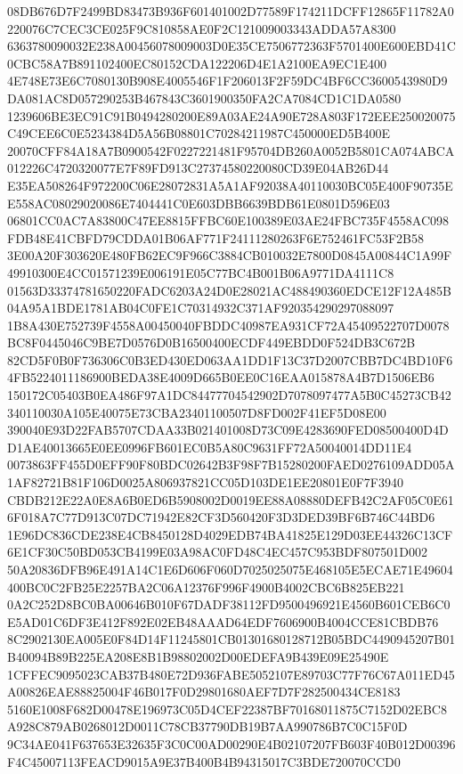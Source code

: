 \documentclass[UTF8,fontset=fandol,zihao=-4,a4paper]{ctexart}
\begin{document}
{{08DB676D7F2499BD83473B936F601401002D77589F174211DCFF12865F11782A0220076C7CEC3CE025F9C810858AE0F2C121009003343ADDA57A8300
6363780090032E238A00456078009003D0E35CE7506772363F5701400E600EBD41C0CBC58A7B891102400EC80152CDA122206D4E1A2100EA9EC1E400
4E748E73E6C7080130B908E4005546F1F206013F2F59DC4BF6CC3600543980D9DA081AC8D057290253B467843C3601900350FA2CA7084CD1C1DA0580
1239606BE3EC91C91B0494280200E89A03AE24A90E728A803F172EEE250020075C49CEE6C0E5234384D5A56B08801C70284211987C450000ED5B400E
20070CFF84A18A7B0900542F0227221481F95704DB260A0052B5801CA074ABCA012226C4720320077E7F89FD913C27374580220080CD39E04AB26D44
E35EA508264F972200C06E28072831A5A1AF92038A40110030BC05E400F90735EE558AC08029020086E7404441C0E603DBB6639BDB61E0801D596E03
06801CC0AC7A83800C47EE8815FFBC60E100389E03AE24FBC735F4558AC098FDB48E41CBFD79CDDA01B06AF771F24111280263F6E752461FC53F2B58
3E00A20F303620E480FB62EC9F966C3884CB010032E7800D0845A00844C1A99F49910300E4CC01571239E006191E05C77BC4B001B06A9771DA4111C8
01563D33374781650220FADC6203A24D0E28021AC488490360EDCE12F12A485B04A95A1BDE1781AB04C0FE1C70314932C371AF920354290297088097
1B8A430E752739F4558A00450040FBDDC40987EA931CF72A45409522707D0078BC8F0445046C9BE7D0576D0B16500400ECDF449EBDD0F524DB3C672B
82CD5F0B0F736306C0B3ED430ED063AA1DD1F13C37D2007CBB7DC4BD10F64FB5224011186900BEDA38E4009D665B0EE0C16EAA015878A4B7D1506EB6
150172C05403B0EA486F97A1DC84477704542902D7078097477A5B0C45273CB42340110030A105E40075E73CBA23401100507D8FD002F41EF5D08E00
390040E93D22FAB5707CDAA33B021401008D73C09E4283690FED08500400D4DD1AE40013665E0EE0996FB601EC0B5A80C9631FF72A50040014DD11E4
0073863FF455D0EFF90F80BDC02642B3F98F7B15280200FAED0276109ADD05A1AF82721B81F106D0025A806937821CC05D103DE1EE20801E0F7F3940
CBDB212E22A0E8A6B0ED6B5908002D0019EE88A08880DEFB42C2AF05C0E616F018A7C77D913C07DC71942E82CF3D560420F3D3DED39BF6B746C44BD6
1E96DC836CDE238E4CB8450128D4029EDB74BA41825E129D03EE44326C13CF6E1CF30C50BD053CB4199E03A98AC0FD48C4EC457C953BDF807501D002
50A20836DFB96E491A14C1E6D606F060D7025025075E468105E5ECAE71E49604400BC0C2FB25E2257BA2C06A12376F996F4900B4002CBC6B825EB221
0A2C252D8BC0BA00646B010F67DADF38112FD9500496921E4560B601CEB6C0E5AD01C6DF3E412F892E02EB48AAAD64EDF7606900B4004CCE81CBDB76
8C2902130EA005E0F84D14F11245801CB01301680128712B05BDC4490945207B01B40094B89B225EA208E8B1B98802002D00EDEFA9B439E09E25490E
1CFFEC9095023CAB37B480E72D936FABE5052107E89703C77F76C67A011ED45A00826EAE88825004F46B017F0D29801680AEF7D7F282500434CE8183
5160E1008F682D00478E196973C05D4CEF22387BF70168011875C7152D02EBC8A928C879AB0268012D0011C78CB37790DB19B7AA990786B7C0C15F0D
9C34AE041F637653E32635F3C0C00AD00290E4B02107207FB603F40B012D00396F4C45007113FEACD9015A9E37B400B4B94315017C3BDE720070CCD0
}}
\end{document}
